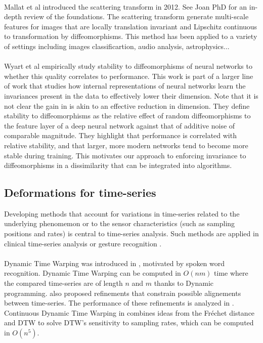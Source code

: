 \paragraph{}
Mallat et al introduced the scattering transform in 2012. See Joan PhD for an in-depth review of the foundations. The scattering transform generate multi-scale features for images that are locally translation invariant and Lipschitz continuous to transformation by diffeomorphisms. This method has been applied to a variety of settings including images classificartion, audio analysis, astrophysics...

\paragraph{}
Wyart et al empirically study stability to diffeomorphisms of neural networks to whether this quality correlates to performance. This work is part of a larger line of work that studies how internal representations of neural networks learn the invariances present in the data to effectively lower their dimension. Note that it is not clear the gain in \cite{bietti} is akin to an effective reduction in dimension. They define stability to diffeomorphisms as the relative effect of random diffeomorphisms to the feature layer of a deep neural network against that of additive noise of comparable magnitude. They highlight that performance is correlated with relative stability, and that larger, more modern networks tend to become more stable during training. This motivates our approach to enforcing invariance to diffeomorphisms in a dissimilarity that can be integrated into algorithms.

\subsection{Deformations for time-series}
\label{background:diffytw}

Developing methods that account for variations in time-series related to the underlying phenomemon or to the sensor characteristics (such as sampling positions and rates) is central to time-series analysis. Such methods are applied in clinical time-series analysis \citep{1808.06725,ortiz-ieee} or gesture recognition \citep{dtw-gesture}.

\paragraph{} Dynamic Time Warping was introduced in \cite{dtw}, motivated by spoken word recognition. Dynamic Time Warping can be computed in $O(nm)$ time where the compared time-series are of length $n$ and $m$ thanks to Dynamic programming. \citep{dtw} also proposed refinements that constrain possible alignements between time-series. The performance of these refinements is analyzed in \cite{sakove-vs-ikatura}. Continuous Dynamic Time Warping in \cite{2203.04531} combines ideas from the Fréchet distance and DTW to solve DTW's sensitivity to sampling rates, which can be computed in $O(n^5)$.

